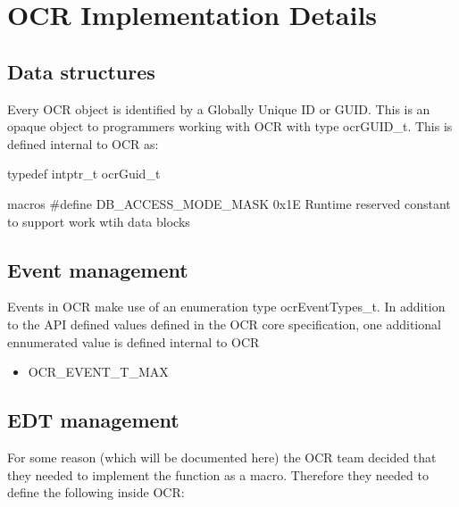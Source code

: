 %

\chapter{OCR Implementation Details}
\label{chap:OCR Implementation Detail}
\label{chap:Appendix C}

\section{Data structures}

Every OCR object is identified by a Globally Unique ID or GUID.  This is an
opaque object to programmers working with OCR with type ocrGUID\_t.  This
is defined internal to OCR as:

 typedef intptr\_t ocrGuid\_t

macros
\#define DB\_ACCESS\_MODE\_MASK 0x1E Runtime reserved constant to support
work wtih data blocks

\section{Event management}

Events in OCR make use of an enumeration type ocrEventTypes\_t.
In addition to the API defined values defined in the OCR core specification,
one additional ennumerated value is defined internal to OCR
\begin{itemize}

\item OCR\_EVENT\_T\_MAX

\end{itemize}

\section{EDT management}

For some reason (which will be documented here) the OCR team decided that they needed
to implement the  function as a macro.  Therefore they
needed to define the following inside OCR:

